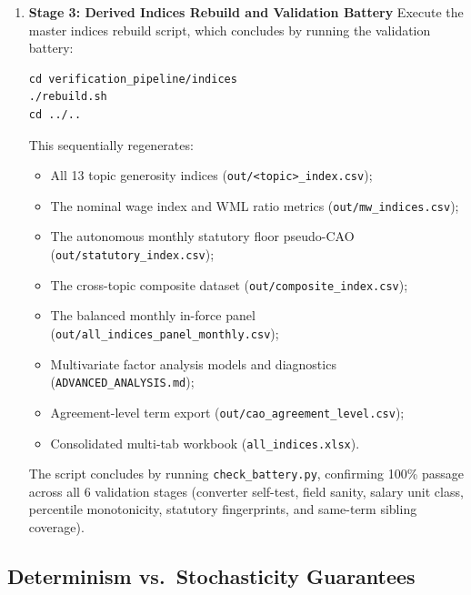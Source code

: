 \begin{enumerate}[leftmargin=2.0em]
  \item \textbf{Stage 3: Derived Indices Rebuild and Validation Battery}
    Execute the master indices rebuild script, which concludes by running the validation battery:
\begin{verbatim}
cd verification_pipeline/indices
./rebuild.sh
cd ../..
\end{verbatim}
    This sequentially regenerates:
    \begin{itemize}[leftmargin=1.2em]
      \item All 13 topic generosity indices (\nolinkurl{out/<topic>_index.csv});
      \item The nominal wage index and WML ratio metrics (\nolinkurl{out/mw_indices.csv});
      \item The autonomous monthly statutory floor pseudo-CAO (\nolinkurl{out/statutory_index.csv});
      \item The cross-topic composite dataset (\nolinkurl{out/composite_index.csv});
      \item The balanced monthly in-force panel (\nolinkurl{out/all_indices_panel_monthly.csv});
      \item Multivariate factor analysis models and diagnostics (\nolinkurl{ADVANCED_ANALYSIS.md});
      \item Agreement-level term export (\nolinkurl{out/cao_agreement_level.csv});
      \item Consolidated multi-tab workbook (\nolinkurl{all_indices.xlsx}).
    \end{itemize}
    The script concludes by running \nolinkurl{check_battery.py}, confirming 100\% passage across all 6 validation stages (converter self-test, field sanity, salary unit class, percentile monotonicity, statutory fingerprints, and same-term sibling coverage).
\end{enumerate}

\subsection{Determinism vs.\ Stochasticity Guarantees}
\label{sec:determinism}

